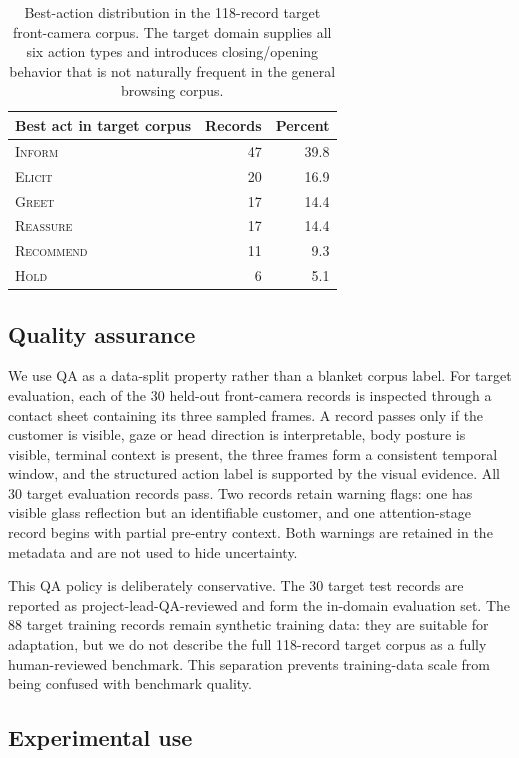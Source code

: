 \begin{table}[t]
\centering
\small
\begin{tabular}{lrr}
\toprule
Best act in target corpus & Records & Percent \\
\midrule
\textsc{Inform} & 47 & 39.8 \\
\textsc{Elicit} & 20 & 16.9 \\
\textsc{Greet} & 17 & 14.4 \\
\textsc{Reassure} & 17 & 14.4 \\
\textsc{Recommend} & 11 & 9.3 \\
\textsc{Hold} & 6 & 5.1 \\
\bottomrule
\end{tabular}
\caption{Best-action distribution in the 118-record target front-camera corpus. The target domain supplies all six action types and introduces closing/opening behavior that is not naturally frequent in the general browsing corpus.}
\label{tab:target-actions}
\end{table}

\subsection{Quality assurance}

We use QA as a data-split property rather than a blanket corpus label. For target evaluation, each of the 30 held-out front-camera records is inspected through a contact sheet containing its three sampled frames. A record passes only if the customer is visible, gaze or head direction is interpretable, body posture is visible, terminal context is present, the three frames form a consistent temporal window, and the structured action label is supported by the visual evidence. All 30 target evaluation records pass. Two records retain warning flags: one has visible glass reflection but an identifiable customer, and one attention-stage record begins with partial pre-entry context. Both warnings are retained in the metadata and are not used to hide uncertainty.

This QA policy is deliberately conservative. The 30 target test records are reported as project-lead-QA-reviewed and form the in-domain evaluation set. The 88 target training records remain synthetic training data: they are suitable for adaptation, but we do not describe the full 118-record target corpus as a fully human-reviewed benchmark. This separation prevents training-data scale from being confused with benchmark quality.

\subsection{Experimental use}

